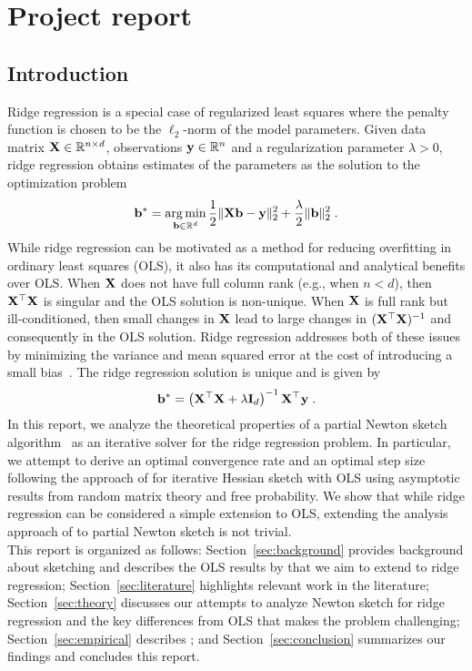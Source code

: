 

\section{Project report}

\subsection{Introduction}

Ridge regression is a special case of regularized least squares where the penalty function is chosen to be the $\ell_2$-norm of the model parameters. Given data matrix $\mathbf{X}\in\mathbb{R}^{n\times d}$, observations $\mathbf{y}\in\mathbb{R}^n$ and a regularization parameter $\lambda>0$, ridge regression obtains estimates of the parameters as the solution to the optimization problem
\[
\mathbf{b}^* = \operatorname*{arg\,min}_{\mathbf{b}\in\mathbb{R}^d} \frac{1}{2}\|\mathbf{X}\mathbf{b}-\mathbf{y}\|_2^2 + \frac{\lambda}{2}\|\mathbf{b}\|_2^2 \;.
\]
While ridge regression can be motivated as a method for reducing overfitting in ordinary least squares (OLS), it also has its computational and analytical benefits over OLS. When $\mathbf{X}$ does not have full column rank (e.g., when $n< d$), then $\mathbf{X}^\top\mathbf{X}$ is singular and the OLS solution is non-unique. When $\mathbf{X}$ is full rank but ill-conditioned, then small changes in $\mathbf{X}$ lead to large changes in $(\mathbf{X}^\top\mathbf{X})^{-1}$ and consequently in the OLS solution. Ridge regression addresses both of these issues by minimizing the variance and mean squared error at the cost of introducing a small bias~\citep{Chowdhury:2018}. The ridge regression solution is unique and is given by
\[
\mathbf{b}^* = \left(\mathbf{X}^\top\mathbf{X} + \lambda\mathbf{I}_d\right)^{-1}\mathbf{X}^\top\mathbf{y} \;.
\]
In this report, we analyze the theoretical properties of a partial Newton sketch algorithm~\citep{Pilanci:2017} as an iterative solver for the ridge regression problem. In particular, we attempt to derive an optimal convergence rate and an optimal step size following the approach of \citet{Lacotte:2020} for iterative Hessian sketch with OLS using asymptotic results from random matrix theory and free probability. We show that while ridge regression can be considered a simple extension to OLS, extending the analysis approach of \citet{Lacotte:2020} to partial Newton sketch is not trivial. \todo
\\

This report is organized as follows: Section~\ref{sec:background} provides background about sketching and describes the OLS results by \citet{Lacotte:2020} that we aim to extend to ridge regression; Section~\ref{sec:literature} highlights relevant work in the literature; Section~\ref{sec:theory} discusses our attempts to analyze Newton sketch for ridge regression and the key differences from OLS that makes the problem challenging; Section~\ref{sec:empirical} describes \todo; and Section~\ref{sec:conclusion} summarizes our findings and concludes this report.

